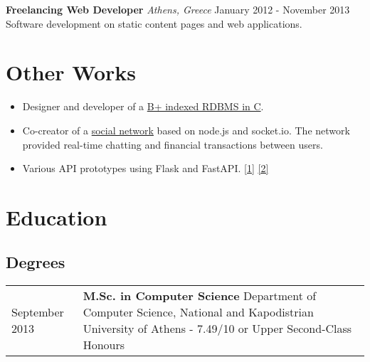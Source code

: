 \documentclass{article}
\begin{document}
        \begin{flushleft}
            \textbf{\large Freelancing Web Developer} \textit{\footnotesize Athens, Greece} \hfill \small January 2012 - November 2013 \newline
		Software development on static content pages and web applications. \newline
		     \\ [1ex]
        \end{flushleft}
	
	\vspace{+0.5cm}
	
		\section*{\color{NavyBlue}Other Works}
		\vspace{-0.5cm}
		{\color{NavyBlue}\hrulefill}
		\begin{itemize}
			\item Designer and developer of a \href{https://github.com/tonyflow/b-RDBMS}{B+ indexed RDBMS in C}.
			\item Co-creator of a \href{https://github.com/tonyflow/mutiny}{social network} based on node.js and socket.io. The network provided real-time chatting and financial transactions between users.
                \item Various API prototypes using Flask and FastAPI. \href{https://github.com/tonyflow/content-moderator-api}{[1]} \href{https://github.com/tonyflow/natural-language-search-api}{[2]}
            \end{itemize}
                

        \section*{\color{NavyBlue} Education}
	\vspace{-0.5cm}
	{\color{NavyBlue} \hrulefill}
	
	\subsection*{Degrees}
	\begin{tabular}{p{2cm}  p{12cm}}
		\small September 2013 & \textbf{M.Sc. in Computer Science} \newline
			Department of Computer Science, National and Kapodistrian University of Athens - 7.49/10 or Upper Second-Class Honours
	\end{tabular}
\end{document}
